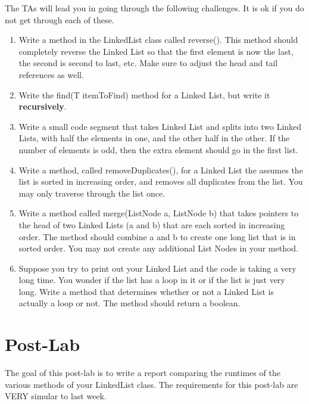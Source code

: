 \documentclass[paper=a4, fontsize=11pt, parskip=full]{scrartcl} %
\numberwithin{equation}{section} %
\numberwithin{figure}{section} %
\numberwithin{table}{section} %
\begin{document}
The TAs will lead you in going through the following challenges. It is ok if you do not get through each of these.

\begin{enumerate}
	\item Write a method in the LinkedList class called reverse(). This method should completely reverse the Linked List so that the first element is now the last, the second is second to last, etc. Make sure to adjust the head and tail references as well.
	\item Write the find(T itemToFind) method for a Linked List, but write it \textbf{recursively}.
	\item Write a small code segment that takes Linked List and splits into two Linked Lists, with half the elements in one, and the other half in the other. If the number of elements is odd, then the extra element should go in the first list.
	\item Write a method, called removeDuplicates(), for a Linked List the assumes the list is sorted in increasing order, and removes all duplicates from the list. You may only traverse through the list once.
	\item Write a method called merge(ListNode a, ListNode b) that takes pointers to the head of two Linked Lists (a and b) that are each sorted in increasing order. The method should combine a and b to create one long list that is in sorted order. You may not create any additional List Nodes in your method.
	\item Suppose you try to print out your Linked List and the code is taking a very long time. You wonder if the list has a loop in it or if the list is just very long. Write a method that determines whether or not a Linked List is actually a loop or not. The method should return a boolean.


\end{enumerate}




\newpage
\section{Post-Lab}

The goal of this post-lab is to write a report comparing the runtimes of the various methods of your LinkedList class. The requirements for this post-lab are VERY simular to last week.
\end{document}
